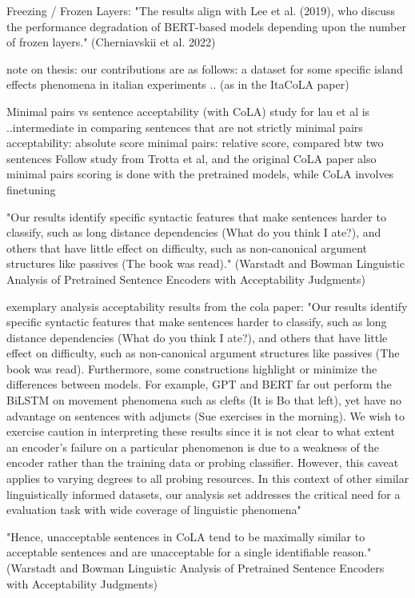 Freezing / Frozen Layers:
"The results align with Lee et al. (2019), who discuss the performance degradation of BERT-based models depending upon the number of frozen layers." (Cherniavskii et al. 2022)

note on thesis:
our contributions are as follows:
a dataset for some specific island effects phenomena in italian
experiments
..
(as in the ItaCoLA paper)


Minimal pairs vs sentence acceptability (with CoLA)
study for lau et al is ..intermediate in comparing sentences that are not strictly minimal pairs
acceptability: absolute score
minimal pairs: relative score, compared btw two sentences
Follow study from Trotta et al, and the original CoLA paper 
also minimal pairs scoring is done with the pretrained models, while CoLA involves finetuning

"Our results identify specific syntactic features
that make sentences harder to classify, such as
long distance dependencies (What do you think I
ate?), and others that have little effect on difficulty, such as non-canonical argument structures
like passives (The book was read)." (Warstadt and Bowman Linguistic Analysis of Pretrained Sentence Encoders with Acceptability Judgments)

exemplary analysis acceptability results from the cola paper:
"Our results identify specific syntactic features
that make sentences harder to classify, such as
long distance dependencies (What do you think I
ate?), and others that have little effect on difficulty, such as non-canonical argument structures
like passives (The book was read). Furthermore,
some constructions highlight or minimize the differences between models. For example, GPT and
BERT far out perform the BiLSTM on movement
phenomena such as clefts (It is Bo that left), yet
have no advantage on sentences with adjuncts (Sue
exercises in the morning). We wish to exercise
caution in interpreting these results since it is not
clear to what extent an encoder’s failure on a particular phenomenon is due to a weakness of the
encoder rather than the training data or probing
classifier. However, this caveat applies to varying
degrees to all probing resources. In this context of
other similar linguistically informed datasets, our
analysis set addresses the critical need for a evaluation task with wide coverage of linguistic phenomena"

"Hence, unacceptable sentences in CoLA tend to
be maximally similar to acceptable sentences and
are unacceptable for a single identifiable reason."   (Warstadt and Bowman Linguistic Analysis of Pretrained Sentence Encoders with Acceptability Judgments)

